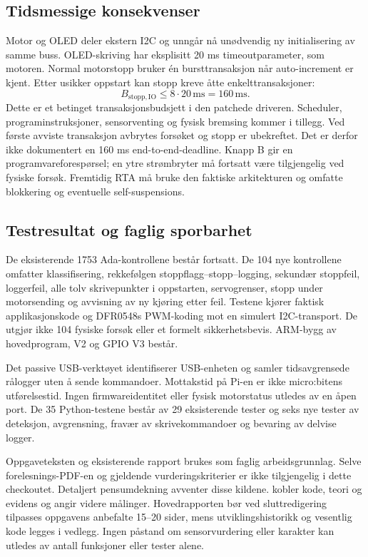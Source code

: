 \subsection{Tidsmessige konsekvenser}
Motor og OLED deler ekstern I2C og unngår nå unødvendig ny initialisering av
samme buss. OLED-skriving har eksplisitt 20 ms timeoutparameter, som motoren.
Normal motorstopp bruker én bursttransaksjon når auto-increment er kjent.
Etter usikker oppstart kan stopp kreve åtte enkelttransaksjoner:
\[
 B_{\mathrm{stopp,IO}} \leq 8\cdot 20\,\mathrm{ms}=160\,\mathrm{ms}.
\]
Dette er et betinget transaksjonsbudsjett i den patchede driveren. Scheduler,
programinstruksjoner, sensorventing og fysisk bremsing kommer i tillegg.
Ved første avviste transaksjon avbrytes forsøket og stopp er ubekreftet.
Det er derfor ikke dokumentert en 160 ms end-to-end-deadline.
Knapp B gir en programvareforespørsel; en ytre strømbryter må fortsatt være
tilgjengelig ved fysiske forsøk. Fremtidig RTA må bruke den faktiske
arkitekturen og omfatte blokkering og eventuelle self-suspensions.

\subsection{Testresultat og faglig sporbarhet}
De eksisterende 1753 Ada-kontrollene består fortsatt. De 104 nye kontrollene
omfatter klassifisering, rekkefølgen stoppflagg--stopp--logging, sekundær
stoppfeil, loggerfeil, alle tolv skrivepunkter i oppstarten, servogrenser,
stopp under motorsending og avvisning av ny kjøring etter feil.
Testene kjører faktisk applikasjonskode og DFR0548s PWM-koding mot en
simulert I2C-transport. De utgjør ikke 104 fysiske forsøk eller et formelt
sikkerhetsbevis. ARM-bygg av hovedprogram, V2 og GPIO V3 består.

Det passive USB-verktøyet  identifiserer USB-enheten og
samler tidsavgrensede rålogger uten å sende kommandoer. Mottakstid på Pi-en
er ikke micro:bitens utførelsestid. Ingen firmwareidentitet eller fysisk
motorstatus utledes av en åpen port. De 35 Python-testene består av 29
eksisterende tester og seks nye tester av deteksjon, avgrensning, fravær av
skrivekommandoer og bevaring av delvise logger.

Oppgaveteksten og eksisterende rapport brukes som faglig arbeidsgrunnlag.
Selve forelesnings-PDF-en og gjeldende vurderingskriterier er ikke tilgjengelig
i dette checkoutet. Detaljert pensumdekning avventer disse kildene.
 kobler kode, teori og evidens og angir videre
målinger. Hovedrapporten bør ved sluttredigering tilpasses oppgavens
anbefalte 15--20 sider, mens utviklingshistorikk og vesentlig kode legges i
vedlegg. Ingen påstand om sensorvurdering eller karakter kan utledes av
antall funksjoner eller tester alene.
